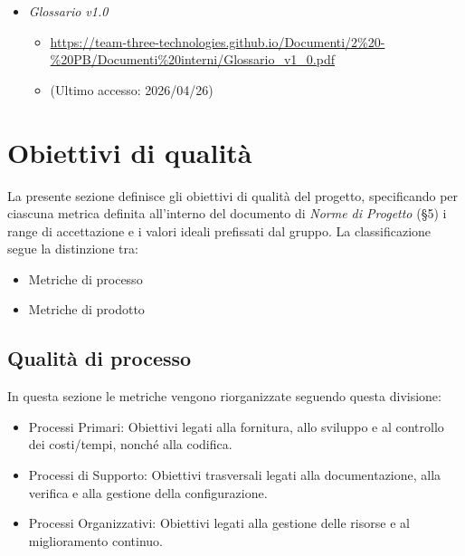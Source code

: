 \documentclass[a4paper,12pt]{article}
\begin{document}
{\begin{itemize}
                    \begin{itemize}
                        \item \url{https://www.math.unipd.it/~tullio/IS-1/2009/Approfondimenti/ISO_12207-1995.pdf}
                        \item[] (Ultimo accesso: 2026/03/03)
                    \end{itemize}
                    \item \textit{Glossario v1.0}
                    \begin{itemize}
                        \item \url{https://team-three-technologies.github.io/Documenti/2%20-%20PB/Documenti%20interni/Glossario_v1_0.pdf}
                        \item[] (Ultimo accesso: 2026/04/26)
                    \end{itemize}
                \end{itemize}
    }

    \newpage

    \section{Obiettivi di qualità}
    La presente sezione definisce gli obiettivi di qualità del progetto, specificando per ciascuna metrica definita all'interno del documento di \textit{Norme di Progetto} (\S5) i range di accettazione e i valori ideali prefissati dal gruppo. La classificazione segue la distinzione tra:
    \begin{itemize}
        \item Metriche di processo
        \item Metriche di prodotto
    \end{itemize}
    
        \subsection{Qualità di processo}
            In questa sezione le metriche vengono riorganizzate seguendo questa divisione: 
            \begin{itemize}
                \item Processi Primari: Obiettivi legati alla fornitura, allo sviluppo e al controllo dei costi/tempi, nonché alla codifica.
                \item Processi di Supporto: Obiettivi trasversali legati alla documentazione, alla verifica e alla gestione della configurazione.
                \item Processi Organizzativi: Obiettivi legati alla gestione delle risorse e al miglioramento continuo.
            \end{itemize}
            
\end{document}
